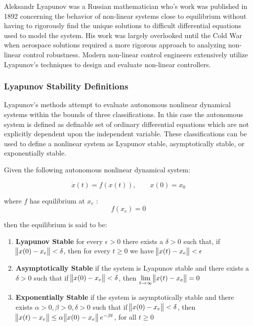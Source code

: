 Aleksandr Lyapunov was a Russian mathematician who's work was published in 1892 \cite{lyapunov1892general} concerning the behavior of non-linear systems close to equilibrium without having to rigorously find the unique solutions to difficult differential equations used to model the system.  His work was largely overlooked until the Cold War when aerospace solutions required a more rigorous approach to analyzing non-linear control robustness.  Modern non-linear control engineers extensively utilize Lyapunov's techniques to design and evaluate non-linear controllers.

\subsubsection{Lyapunov Stability Definitions}

Lyapunov's methods attempt to evaluate autonomous nonlinear dynamical systems within the bounds of three classifications.  In this case the autonomous system is defined as definable set of ordinary differential equations which are not explicitly dependent upon the independent variable.  These classifications can be used to define a nonlinear system as Lyapunov stable, asymptotically stable, or exponentially stable.

Given the following autonomous nonlinear dynamical system:

 \begin{equation}
\dot{x}(t)=f(x(t)), \qquad x(0)=x_0
\end{equation}

where $f$ has equilibrium at $x_e$ :
 \begin{equation}
f(x_e) = 0
\end{equation}

then the equilibrium is said to be:
\begin{enumerate}
	\item \textbf{Lyapunov Stable} \newline
	for every $\epsilon > 0$ there exists a $\delta > 0$ such that, if \: $\norm{x(0) - x_e} < \delta$, then for every $t \geq 0$ we have 	$ \norm{x(t) - x_e} < \epsilon$	
	\item \textbf{Asymptotically Stable} \newline
	if the system is Lyapunov stable and there exists a $\delta > 0$ such that if \: $\norm{x(0) - x_e}  < \delta$, then $\displaystyle \lim_{t\to \infty} \norm{x(t)-x_e} =0$
	\item \textbf{Exponentially Stable} \newline
	if the system is asymptotically stable and there exists $\alpha > 0, \beta > 0, \delta > 0$ such that if $\norm{x(0)-x_e}<\delta$, then \:$\norm{x(t)-x_e} \leq \alpha \norm{x(0)-x_e} e^{-\beta t}$, for all $t \geq 0$
\end{enumerate}

